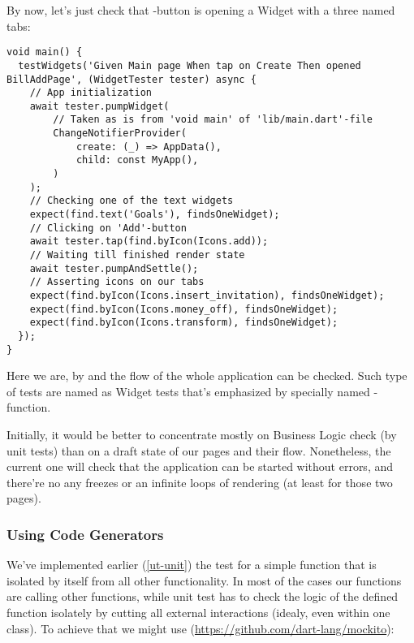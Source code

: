 \noindent By now, let's just check that -button is opening a Widget with a three named tabs:

\begin{lstlisting}
void main() {
  testWidgets('Given Main page When tap on Create Then opened BillAddPage', (WidgetTester tester) async {
    // App initialization
    await tester.pumpWidget(
        // Taken as is from 'void main' of 'lib/main.dart'-file
        ChangeNotifierProvider(
            create: (_) => AppData(),
            child: const MyApp(),
        )
    );
    // Checking one of the text widgets
    expect(find.text('Goals'), findsOneWidget);
    // Clicking on 'Add'-button
    await tester.tap(find.byIcon(Icons.add));
    // Waiting till finished render state
    await tester.pumpAndSettle();
    // Asserting icons on our tabs
    expect(find.byIcon(Icons.insert_invitation), findsOneWidget);
    expect(find.byIcon(Icons.money_off), findsOneWidget);
    expect(find.byIcon(Icons.transform), findsOneWidget);
  });
}
\end{lstlisting}

\noindent Here we are, by  and  the flow of the whole application can be checked. Such type of tests 
are named as Widget tests that's emphasized by specially named -function.

Initially, it would be better to concentrate mostly on Business Logic check (by unit tests) than on a draft state of 
our pages and their flow. Nonetheless, the current one will check that the application can be started without errors, 
and there're no any freezes or an infinite loops of rendering (at least for those two pages). 


\subsubsection{Using Code Generators} \label{ut-code-generator}

We've implemented earlier (\ref{ut-unit}) the test for a simple function that is isolated by itself from all other 
functionality. In most of the cases our functions are calling other functions, while unit test has to check the logic 
of the defined function isolately by cutting all external interactions (idealy, even within one class). To achieve that 
we might use  (\href{https://github.com/dart-lang/mockito}{https://github.com/dart-lang/mockito}):

